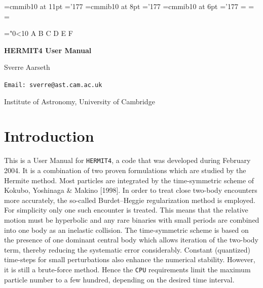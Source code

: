 \documentclass[12pt]{article}
\begin{document}
\def\AJ{{\it Astron. J.} }
\def\APJ{{\it Astrophys. J.} }
\def\ApJ{{\it Astrophys. J.} }
\def\MN{{\it Mon. Not. R. Astron. Soc.} }
\def\AA{{\it Astron. Astrophys.} }
\def\CM{{\it Celes. Mech.} }
\def\CMD{{\it Celes. Mech. Dyn. Ast.} }
\def\PASJ{{\it Publ. Astron. Soc. Japan} }
\def\SJA{S.J. Aarseth}
\def\SAA{S.J. Aarseth }


\font\elevenmib=cmmib10 at 11pt \skewchar\elevenmib='177
\font\eightmib=cmmib10 at 8pt   \skewchar\eightmib='177
\font\sixmib=cmmib10 at 6pt     \skewchar\sixmib='177
%
\newfam\mibfam
\textfont\mibfam=\elevenmib
\scriptfont\mibfam=\eightmib
\scriptscriptfont\mibfam=\sixmib

\def\hexnum#1{\ifnum#1<10 \number#1\else
 \ifnum#1=10 A\else\ifnum#1=11 B\else\ifnum#1=12 C\else
 \ifnum#1=13 D\else\ifnum#1=14 E\else\ifnum#1=15 F\fi\fi\fi\fi\fi\fi\fi}
\def\mib{\hexnum\mibfam}

\mathchardef\bmu="0\mib16

 
 
\centerline {\Large {\bf {HERMIT4 User Manual~~~~}}}
\bigskip
\centerline {\Large {Sverre Aarseth~~~}}
\bigskip
\centerline {\large {\tt Email: sverre@ast.cam.ac.uk}~~~~~}
\bigskip
\centerline {\large {Institute of Astronomy, University of Cambridge~~~~}}
\medskip
\bigskip
\section{Introduction}

This is a User Manual for {\tt HERMIT4}, a code that was developed
during February 2004.
It is a combination of two proven formulations which are studied by the
Hermite method.
Most particles are integrated by the time-symmetric scheme of
Kokubo, Yoshinaga \& Makino [1998].
In order to treat close two-body encounters more accurately, the so-called
Burdet--Heggie regularization method is employed.
For simplicity only one such encounter is treated.
This means that the relative motion must be hyperbolic and any rare
binaries with small periods are combined into one body as an inelastic
collision.
The time-symmetric scheme is based on the presence of one dominant
central body which allows iteration of the two-body term, thereby reducing
the systematic error considerably.
Constant (quantized) time-steps for small perturbations also enhance the 
numerical stability.
However, it is still a brute-force method.
Hence the {\tt CPU} requirements limit the maximum particle number to
a few hundred, depending on the desired time interval.
\end{document}
